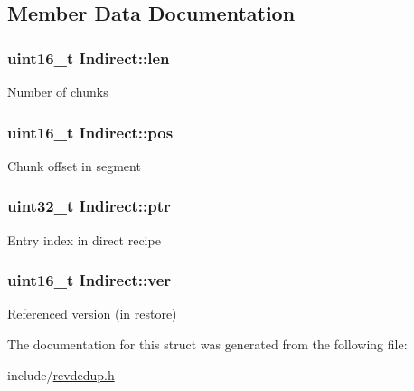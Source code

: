 \subsection{\-Member \-Data \-Documentation}
\hypertarget{structIndirect_a08b02afe989e584c66794b3728bddf78}{
\subsubsection[{len}]{\setlength{\rightskip}{0pt plus 5cm}uint16\-\_\-t {\bf \-Indirect\-::len}}}\label{structIndirect_a08b02afe989e584c66794b3728bddf78}
\-Number of chunks \hypertarget{structIndirect_a635344862b3a3ba8501476e6acc26749}{
\subsubsection[{pos}]{\setlength{\rightskip}{0pt plus 5cm}uint16\-\_\-t {\bf \-Indirect\-::pos}}}\label{structIndirect_a635344862b3a3ba8501476e6acc26749}
\-Chunk offset in segment \hypertarget{structIndirect_a5396d5e3a2dfcaa56508d9c95a3ccd59}{
\subsubsection[{ptr}]{\setlength{\rightskip}{0pt plus 5cm}uint32\-\_\-t {\bf \-Indirect\-::ptr}}}\label{structIndirect_a5396d5e3a2dfcaa56508d9c95a3ccd59}
\-Entry index in direct recipe \hypertarget{structIndirect_acfeca4a51291e8071fddba92c2c64912}{
\subsubsection[{ver}]{\setlength{\rightskip}{0pt plus 5cm}uint16\-\_\-t {\bf \-Indirect\-::ver}}}\label{structIndirect_acfeca4a51291e8071fddba92c2c64912}
\-Referenced version (in restore) 

\-The documentation for this struct was generated from the following file\-:\begin{DoxyCompactItemize}
\item 
include/\hyperlink{revdedup_8h}{revdedup.\-h}\end{DoxyCompactItemize}
